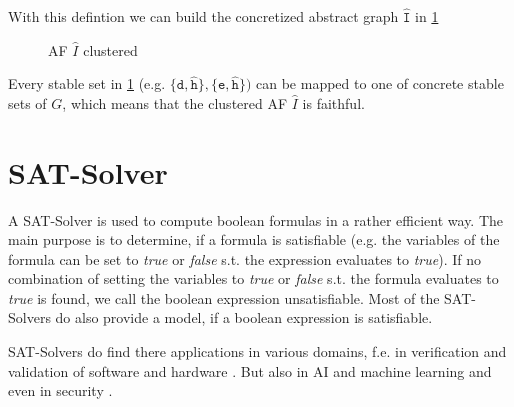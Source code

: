 With this defintion we can build the concretized abstract graph $\mathtt{\hat{I}}$ in \ref{af:backgroundClusterExample3}


\begin{figure}[h]
    \centering
    \caption{\ac{AF} $\hat{I}$ clustered}
    \label{af:backgroundClusterExample3}
\end{figure}

Every stable set in \ref{af:backgroundClusterExample3} (e.g. $\mathtt{\{d, \hat{h}\}, \{e, \hat{h}\}})$ can be mapped to one of concrete stable sets of $G$, which means that the clustered AF $\hat{I}$ is faithful.


\section{SAT-Solver}
A SAT-Solver is used to compute boolean formulas in a rather efficient way. The main purpose is to determine, if a formula is satisfiable (e.g. the variables of the formula can be set to \textit{true} or \textit{false} s.t. the expression evaluates to \textit{true}). If no combination of setting the variables to \textit{true} or \textit{false} s.t. the formula evaluates to \textit{true} is found, we call the boolean expression unsatisfiable. Most of the SAT-Solvers do also provide a model, if a boolean expression is satisfiable.

SAT-Solvers do find there applications in various domains, f.e. in verification and validation of software and hardware \cite{DBLP:conf/dagstuhl/Gogolla09, DBLP:books/daglib/0045943}. But also in AI and machine learning \cite{DBLP:phd/basesearch/Liang18a} and even in security \cite{Pasero2022-SATHashFunctions-Repo, DBLP:journals/iacr/LinYXTS24}.

